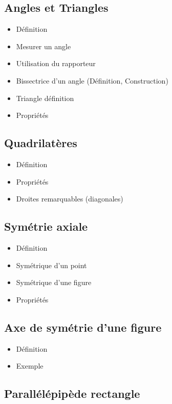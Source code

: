 \subsection{Angles et Triangles}

\begin{itemize}
	\item Définition
	\item Mesurer un angle
	\item Utilisation du rapporteur
	\item Bissectrice d'un angle (Définition, Construction)
	\item Triangle définition
	\item Propriétés
\end{itemize}

\subsection{Quadrilatères}
\begin{itemize}
	\item Définition
	\item Propriétés
	\item Droites remarquables (diagonales)
\end{itemize}

\subsection{Symétrie axiale}

\begin{itemize}
	\item Définition
	\item Symétrique d'un point
	\item Symétrique d'une figure
	\item Propriétés
\end{itemize}

\subsection{Axe de symétrie d'une figure}

\begin{itemize}
	\item Définition
	\item Exemple
\end{itemize}

\subsection{Parallélépipède rectangle}

